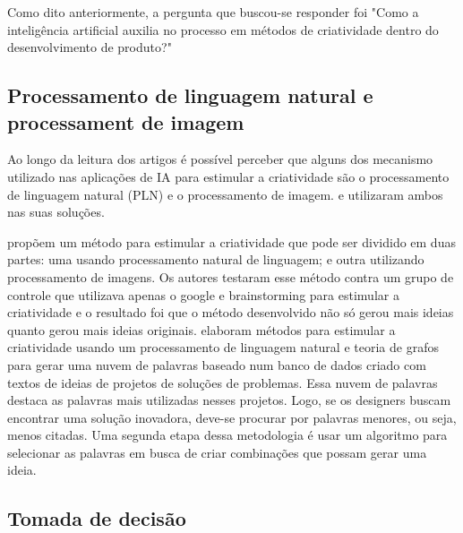 Como dito anteriormente, a pergunta que buscou-se responder foi "Como a inteligência artificial auxilia no processo em métodos de criatividade dentro do desenvolvimento de produto?"

\subsection*{Processamento de linguagem natural e processament de imagem}

Ao longo da leitura dos artigos é possível perceber que alguns dos mecanismo utilizado nas aplicações de IA para estimular a criatividade são o processamento de linguagem natural (PLN) e o processamento de imagem.  e  utilizaram ambos nas suas soluções.

 propõem um método para estimular a criatividade que pode ser dividido em duas partes: uma usando processamento natural de linguagem; e outra utilizando processamento de imagens. Os autores testaram esse método contra um grupo de controle que utilizava apenas o google e brainstorming para estimular a criatividade e o resultado foi que o método desenvolvido não só gerou mais ideias quanto gerou mais ideias originais.
 elaboram métodos para estimular a criatividade usando um processamento de linguagem natural e teoria de grafos para gerar uma nuvem de palavras baseado num banco de dados criado com textos de ideias de projetos de soluções de problemas. Essa nuvem de palavras destaca as palavras mais utilizadas nesses projetos. Logo, se os designers buscam encontrar uma solução inovadora, deve-se procurar por palavras menores, ou seja, menos citadas. Uma segunda etapa dessa metodologia é usar um algoritmo para selecionar as palavras em busca de criar combinações que possam gerar uma ideia.



\subsection*{Tomada de decisão}

